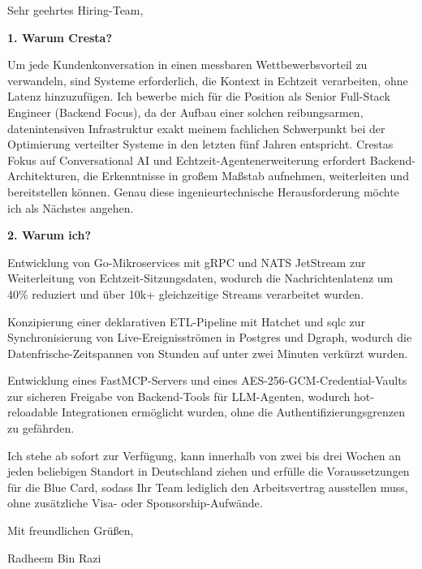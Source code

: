 \documentclass[11pt,a4paper]{coverletter}
\begin{document}
\opening{Sehr geehrtes Hiring-Team,}

\vspace{8pt}\noindent\textbf{1. Warum Cresta?}\par\vspace{3pt}

Um jede Kundenkonversation in einen messbaren Wettbewerbsvorteil zu verwandeln, sind Systeme erforderlich, die Kontext in Echtzeit verarbeiten, ohne Latenz hinzuzufügen. Ich bewerbe mich für die Position als Senior Full-Stack Engineer (Backend Focus), da der Aufbau einer solchen reibungsarmen, datenintensiven Infrastruktur exakt meinem fachlichen Schwerpunkt bei der Optimierung verteilter Systeme in den letzten fünf Jahren entspricht. Crestas Fokus auf Conversational AI und Echtzeit-Agentenerweiterung erfordert Backend-Architekturen, die Erkenntnisse in großem Maßstab aufnehmen, weiterleiten und bereitstellen können. Genau diese ingenieurtechnische Herausforderung möchte ich als Nächstes angehen.

\vspace{8pt}\noindent\textbf{2. Warum ich?}\par\vspace{3pt}

\bullets

  \item Entwicklung von Go-Mikroservices mit gRPC und NATS JetStream zur Weiterleitung von Echtzeit-Sitzungsdaten, wodurch die Nachrichtenlatenz um 40\% reduziert und über 10k+ gleichzeitige Streams verarbeitet wurden.

  \item Konzipierung einer deklarativen ETL-Pipeline mit Hatchet und sqlc zur Synchronisierung von Live-Ereignisströmen in Postgres und Dgraph, wodurch die Datenfrische-Zeitspannen von Stunden auf unter zwei Minuten verkürzt wurden.

  \item Entwicklung eines FastMCP-Servers und eines AES-256-GCM-Credential-Vaults zur sicheren Freigabe von Backend-Tools für LLM-Agenten, wodurch hot-reloadable Integrationen ermöglicht wurden, ohne die Authentifizierungsgrenzen zu gefährden.

\bulletsend

Ich stehe ab sofort zur Verfügung, kann innerhalb von zwei bis drei Wochen an jeden beliebigen Standort in Deutschland ziehen und erfülle die Voraussetzungen für die Blue Card, sodass Ihr Team lediglich den Arbeitsvertrag ausstellen muss, ohne zusätzliche Visa- oder Sponsorship-Aufwände.

\closing{Mit freundlichen Grüßen,}{Radheem Bin Razi}
\end{document}
